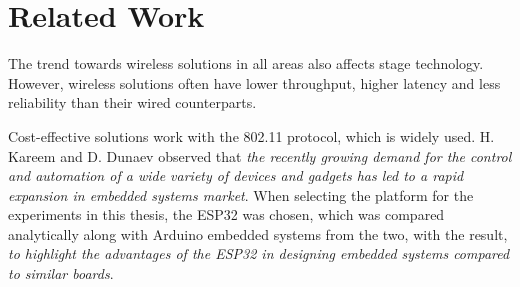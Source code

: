   
\chapter{Related Work}



The trend towards wireless solutions in all areas also affects stage technology.
However, wireless solutions often have lower throughput, higher latency and less reliability than their wired counterparts.

Cost-effective solutions work with the 802.11 protocol, which is widely used. 
H. Kareem and D. Dunaev \cite{TheWorkingPrincipalsOfESP32} observed that
\emph{the recently growing demand for the control and automation of a wide variety of devices and gadgets has
led to a rapid expansion in embedded systems market}.
When selecting the platform for the experiments in this thesis, the ESP32 was chosen, 
which was compared analytically along with Arduino embedded systems from the two,
with the result, \emph{to highlight the advantages of the ESP32 in designing embedded systems compared to similar boards}.

